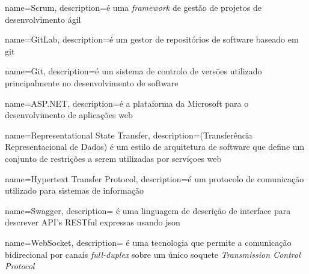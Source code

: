 {
	name=Scrum,
	description={é uma \textit{framework} de gestão de projetos de desenvolvimento ágil}
}

{
	name=GitLab,
	description={é um gestor de repositórios de software baseado em \gls{git}}
}

{
	name=Git,
	description={é um sistema de controlo de versões utilizado principalmente no
	desenvolvimento de software}
}

{
	name=ASP.NET,
	description={é a plataforma da Microsoft para o desenvolvimento de aplicações web}
}

{
	name={Representational State Transfer},
	description={(Transferência Representacional de Dados) é um estilo de arquitetura de
	software que define um conjunto de restrições a serem utilizadas por serviçoes web}
}

{
	name={Hypertext Transfer Protocol},
	description={é um protocolo de comunicação utilizado para sistemas de informação}
}

{
	name={Swagger},
	description={ é uma linguagem de descrição de interface para descrever API's RESTful
	expressas usando \acrshort{json}}
}

{
	name={WebSocket},
	description={ é uma tecnologia que permite a comunicação bidirecional por canais
	\textit{full-duplex} sobre um único soquete \textit{Transmission Control Protocol}}
}




